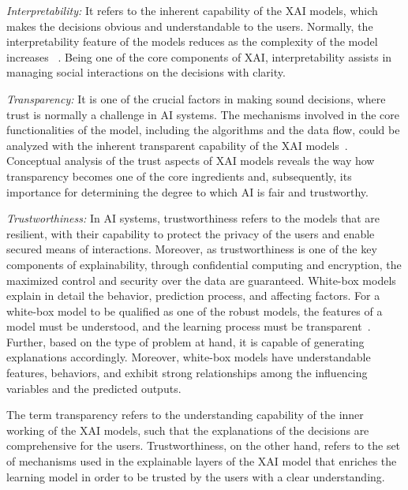 \documentclass[journal]{IEEEtran}
\begin{document}
\textit{Interpretability:} It refers to the inherent capability of the XAI models, which makes the decisions obvious and understandable to the users. Normally, the interpretability feature of the models reduces as the complexity of the model increases ~\cite{dikshit2021interpretable}. Being one of the core components of XAI, interpretability assists in managing social interactions on the decisions with clarity.

\textit{Transparency:} It is one of the crucial factors in making sound decisions, where trust is normally a challenge in AI systems. The mechanisms involved in the core functionalities of the model, including the algorithms and the data flow, could be analyzed with the inherent transparent capability of the XAI models~\cite{von2021transparency}. Conceptual analysis of the trust aspects of XAI models reveals the way how transparency becomes one of the core ingredients and, subsequently, its importance for determining the degree to which AI is fair and trustworthy. 

\textit{Trustworthiness:} In AI systems, trustworthiness refers to the models that are resilient, with their capability to protect the privacy of the users and enable secured means of interactions. Moreover, as trustworthiness is one of the key components of explainability, through confidential computing and encryption, the maximized control and security over the data are guaranteed. White-box models explain in detail the behavior, prediction process, and affecting factors. For a white-box model to be qualified as one of the robust models, the features of a model must be understood, and the learning process must be transparent~\cite{rawal2021recent}. Further, based on the type of problem at hand, it is capable of generating explanations accordingly. Moreover, white-box models have understandable features, behaviors, and exhibit strong relationships among the influencing variables and the predicted outputs.

The term transparency refers to the understanding capability of the inner working of the XAI models, such that the explanations of the decisions are comprehensive for the users. Trustworthiness, on the other hand, refers to the set of mechanisms used in the explainable layers of the XAI model that enriches the learning model in order to be trusted by the users with a clear understanding.
\end{document}
